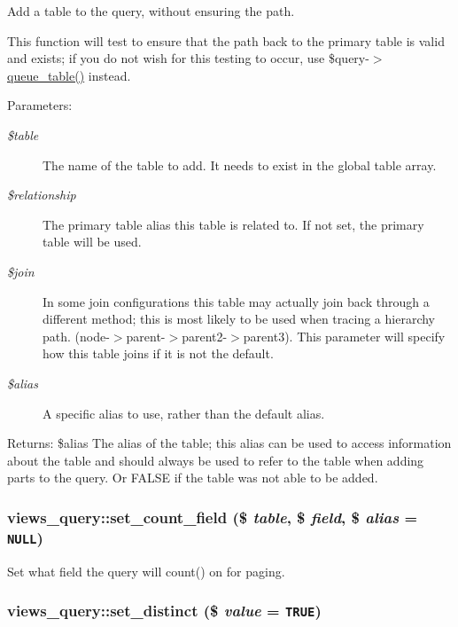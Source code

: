 Add a table to the query, without ensuring the path.

This function will test to ensure that the path back to the primary table is valid and exists; if you do not wish for this testing to occur, use \$query-$>$\hyperlink{classviews__query_0ed3905be8cddfdbde96a39569686bcb}{queue\_\-table()} instead.

\begin{Desc}
\item[Parameters:]
\begin{description}
\item[{\em \$table}]The name of the table to add. It needs to exist in the global table array. \item[{\em \$relationship}]The primary table alias this table is related to. If not set, the primary table will be used. \item[{\em \$join}]In some join configurations this table may actually join back through a different method; this is most likely to be used when tracing a hierarchy path. (node-$>$parent-$>$parent2-$>$parent3). This parameter will specify how this table joins if it is not the default. \item[{\em \$alias}]A specific alias to use, rather than the default alias.\end{description}
\end{Desc}
\begin{Desc}
\item[Returns:]\$alias The alias of the table; this alias can be used to access information about the table and should always be used to refer to the table when adding parts to the query. Or FALSE if the table was not able to be added. \end{Desc}
\hypertarget{classviews__query_b669461223ddaae12248f28b4ccfb525}{
\subsubsection[{set\_\-count\_\-field}]{\setlength{\rightskip}{0pt plus 5cm}views\_\-query::set\_\-count\_\-field (\$ {\em table}, \/  \$ {\em field}, \/  \$ {\em alias} = {\tt NULL})}}
\label{classviews__query_b669461223ddaae12248f28b4ccfb525}


Set what field the query will count() on for paging. \hypertarget{classviews__query_cb3f17ef4ae3d80a44ee7b6962165247}{
\subsubsection[{set\_\-distinct}]{\setlength{\rightskip}{0pt plus 5cm}views\_\-query::set\_\-distinct (\$ {\em value} = {\tt TRUE})}}
\label{classviews__query_cb3f17ef4ae3d80a44ee7b6962165247}


